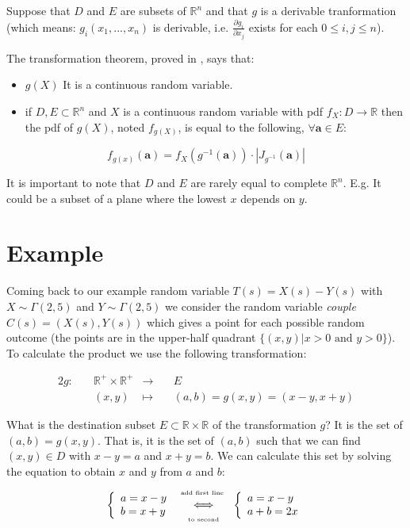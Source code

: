 \documentclass{article}
\newcommand\R{{\mathbb R} }
\begin{document}
Suppose that $D$ and $E$ are subsets of $\R^n$ and that $g$ is a derivable tranformation (which means: $g_i(x_1,...,x_n)$ is derivable, i.e. $\frac{\partial g_i}{\partial x_j}$ exists for each $0 \le i,j  \le n$).  

The transformation theorem, proved in \cite[2.7]{Hogg-McKean}, says that:

\begin{itemize}
\item $g(X)$ It is a continuous random variable.
\item if $D, E \subset \R ^n$ and $X$ is a continuous random variable with pdf $f_X:D \rightarrow \R $ then the pdf of
  $g(X)$, noted $f_{g(X)}$, is equal to the following, $\forall {\mathbf a} \in E$:
\end{itemize}

$$  f_{g(x)}({\mathbf a}) = f_X(g^{-1}({\mathbf a})) \cdot | J_{g^{-1}}({\mathbf a})|$$

It is important to note that $D$ and $E$ are rarely equal to complete $\R^n$. E.g. It could be a subset of a plane where the lowest $x$ depends on $y$.


\section{Example}

Coming back to our example random variable $T(s)=X(s)-Y(s)$ with $X\sim \Gamma(2,5)$ and $Y\sim \Gamma(2,5)$ we consider the random variable {\it couple} $C(s) = (X(s), Y(s))$ which gives a point for each possible random outcome (the points are in the upper-half quadrant $\{(x,y)| x>0 \mbox{ and } y>0\}$). To calculate the product we use the following transformation:

\begin{alignat*}{2}
g:\quad & \R^+ \times \R^+ &\longrightarrow \quad & E \\
& (x,y) & \mapsto\quad & (a,b) = g(x,y) = (x-y, x+y) 
\end{alignat*}


What is the destination subset $E\subset \R \times \R$ of the transformation $g$? It is the set of $(a,b)=g(x,y)$. That is, it is the set of $(a,b)$ such that we can find $(x,y)\in D$ with $x-y = a$ and $x+y= b$. We can calculate this set by solving the equation to obtain $x$ and $y$ from $a$ and $b$:
\renewcommand\arraystretch{1.2}
$$
\left\{\begin{array}{l} a = x-y\\ b = x+y \end{array}\right. 
\begin{array}{c}\mbox{\tiny add first line }\\\Longleftrightarrow\\\mbox{\tiny to second}\end{array}
\left\{\begin{array}{l} a = x-y\\ a+b = 2x\end{array}\right.$$
\end{document}
